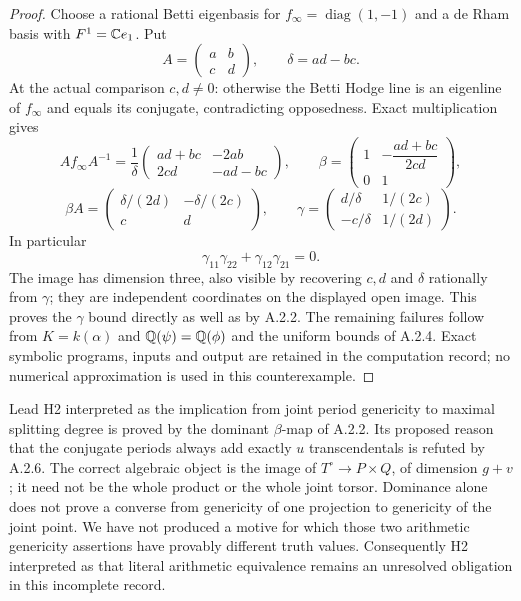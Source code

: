\begin{proof}
Choose a rational Betti eigenbasis for
$f_\infty=\operatorname{diag}(1,-1)$ and a de Rham basis with
$F^1=\mathbb C e_1$. Put
\[
 A=\begin{pmatrix}a&b\\c&d\end{pmatrix},\qquad \delta=ad-bc.
\]
At the actual comparison $c,d\ne0$: otherwise the Betti Hodge
line is an eigenline of $f_\infty$ and equals its conjugate,
contradicting opposedness. Exact multiplication gives
\[
 Af_\infty A^{-1}=\frac1\delta
  \begin{pmatrix}ad+bc&-2ab\\2cd&-ad-bc\end{pmatrix},
 \qquad
 \beta=\begin{pmatrix}1&-\dfrac{ad+bc}{2cd}\\0&1\end{pmatrix},
\]
\[
 \beta A=\begin{pmatrix}\delta/(2d)&-\delta/(2c)\\c&d\end{pmatrix},
 \qquad
 \gamma=\begin{pmatrix}d/\delta&1/(2c)\\-c/\delta&1/(2d)\end{pmatrix}.
\]
In particular
\[
               \gamma_{11}\gamma_{22}+\gamma_{12}\gamma_{21}=0.
\]
The image has dimension three, also visible by recovering $c,d$
and $\delta$ rationally from $\gamma$; they are independent
coordinates on the displayed open image. This proves the
$\gamma$ bound directly as well as by A.2.2. The remaining
failures follow from $K=k(\alpha)$ and $\mathbb Q(\psi)=\mathbb Q(\phi)$
and the uniform bounds of A.2.4. Exact symbolic programs,
inputs and output are retained in the computation record; no
numerical approximation is used in this counterexample.
\end{proof}

Lead H2 interpreted as the implication from joint period
genericity to maximal splitting degree is proved by the dominant
$\beta$-map of A.2.2. Its proposed reason that the conjugate periods
always add exactly $u$ transcendentals is refuted by A.2.6. The
correct algebraic object is the image of $T^\circ\to P\times Q$,
of dimension $g+v$; it need not be the whole product or the whole
joint torsor. Dominance alone does not prove a converse from
genericity of one projection to genericity of the joint point.
We have not produced a motive for which those two arithmetic
genericity assertions have provably different truth values.
Consequently H2 interpreted as that literal arithmetic equivalence
remains an unresolved obligation in this incomplete record.

